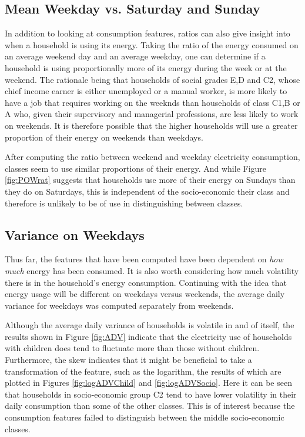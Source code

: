 \subsection*{Mean Weekday vs. Saturday and Sunday}
In addition to looking at consumption features, ratios can also give insight into when a household is using its energy. Taking the ratio of the energy consumed on an average weekend day and an average weekday, one can determine if a household is using proportionally more of its energy during the week or at the weekend. The rationale being that households of social grades E,D and C2, whose chief income earner is either unemployed or a manual worker, is more likely to have a job that requires working on the weeknds than households of class C1,B or A who, given their supervisory and managerial professions, are less likely to work on weekends. It is therefore possible that the higher households will use a greater proportion of their energy on weekends than weekdays. 
\POWrat

After computing the ratio between weekend and weekday electricity consumption, classes seem to use similar proportions of their energy. And while Figure \ref{fig:POWrat} suggests that households use more of their energy on Sundays than they do on Saturdays, this is independent of the socio-economic their class and therefore is unlikely to be of use in distinguishing between classes.


\subsection*{Variance on Weekdays}
Thus far, the features that have been computed have been dependent on \textit{how much} energy has been consumed. It is also worth considering how much volatility there is in the household's energy consumption. Continuing with the idea that energy usage will be different on weekdays versus weekends, the average daily variance for weekdays was computed separately from weekends. 


Although the average daily variance of households is volatile in and of itself, the results shown in Figure \ref{fig:ADV} indicate that the electricity use of households with children does tend to fluctuate more than those without children. Furthermore, the skew indicates that it might be beneficial to take a transformation of the feature, such as the logarithm, the results of which are plotted in Figures \ref{fig:logADVChild} and \ref{fig:logADVSocio}. Here it can be seen that households in socio-economic group C2 tend to have lower volatility in their daily consumption than some of the other classes. This is of interest because the consumption features failed to distinguish between the middle socio-economic classes.

